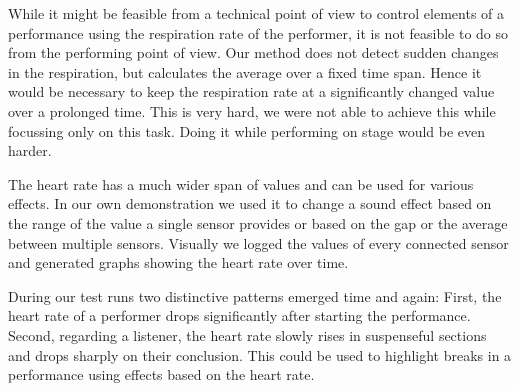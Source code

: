 \documentclass{sigchi-ext}
\begin{document}
While it might be feasible from a technical point of view to control elements of a performance using the respiration
rate of the performer, it is not feasible to do so from the performing point of view. Our method does not detect
sudden changes in the respiration, but calculates the average over a fixed time span. Hence it would be necessary
to keep the respiration rate at a significantly changed value over a prolonged time. This is very hard, we were
not able to achieve this while focussing only on this task. Doing it while performing on stage would be even harder.

The heart rate has a much wider span of values and can be used for various effects. In our own demonstration we used
it to change a sound effect based on the range of the value a single sensor provides or based on the gap or the average
between multiple sensors. Visually we logged the values of every connected sensor and generated graphs showing the
heart rate over time.

During our test runs two distinctive patterns emerged time and again: First, the heart rate of a performer
drops significantly after starting the performance. Second, regarding a listener, the heart rate slowly rises
in suspenseful sections and drops sharply on their conclusion. This could be used to highlight
breaks in a performance using effects based on the heart rate.

\balance{} 



\end{document}

